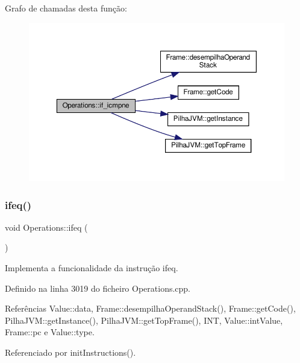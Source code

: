 Grafo de chamadas desta função\+:
\nopagebreak
\begin{figure}[H]
\begin{center}
\leavevmode
\includegraphics[width=350pt]{classOperations_a52dca630766e37bbaf0e7439c0335273_cgraph}
\end{center}
\end{figure}
\mbox{\label{classOperations_ad33c8bdb5f67bdbf0885bb51990f99ee}} 
\subsubsection{\texorpdfstring{ifeq()}{ifeq()}}
{\footnotesize\ttfamily void Operations\+::ifeq (\begin{DoxyParamCaption}{ }\end{DoxyParamCaption})\hspace{0.3cm}{\ttfamily [private]}}



Implementa a funcionalidade da instrução ifeq. 



Definido na linha 3019 do ficheiro Operations.\+cpp.



Referências Value\+::data, Frame\+::desempilha\+Operand\+Stack(), Frame\+::get\+Code(), Pilha\+J\+V\+M\+::get\+Instance(), Pilha\+J\+V\+M\+::get\+Top\+Frame(), I\+NT, Value\+::int\+Value, Frame\+::pc e Value\+::type.



Referenciado por init\+Instructions().

